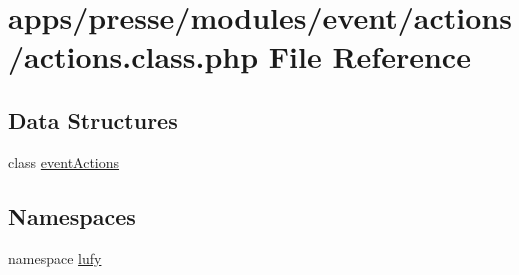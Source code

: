 \hypertarget{presse_2modules_2event_2actions_2actions_8class_8php}{\section{apps/presse/modules/event/actions/actions.class.\-php File Reference}
\label{presse_2modules_2event_2actions_2actions_8class_8php}
}
\subsection*{Data Structures}
\begin{DoxyCompactItemize}
\item 
class \hyperlink{classevent_actions}{event\-Actions}
\end{DoxyCompactItemize}
\subsection*{Namespaces}
\begin{DoxyCompactItemize}
\item 
namespace \hyperlink{namespacelufy}{lufy}
\end{DoxyCompactItemize}

